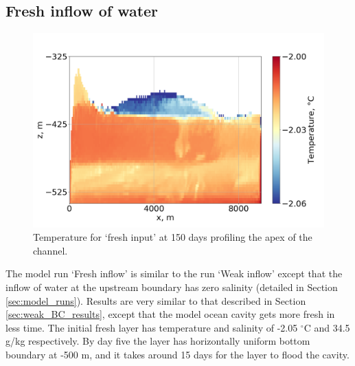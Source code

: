 \subsection{Fresh inflow of water} \label{sec:fresh_inflow}

\begin{figure}[!ht]
\centering
\includegraphics[width=1\textwidth]{chapters/4/fresh_input_T.png}
\caption[Fresh input (T)]{Temperature for `fresh input' at 150 days profiling the apex of the channel.}
\label{fig:fresh_input_T}
\end{figure}

The model run `Fresh inflow' is similar to the run `Weak inflow' except that the inflow of water at the upstream boundary has zero salinity (detailed in Section \ref{sec:model_runs}). Results are very similar to that described in Section \ref{sec:weak_BC_results}, except that the model ocean cavity gets more fresh in less time.
The initial fresh layer has temperature and salinity of -2.05 $^{\circ}$C and 34.5  g/kg respectively.  By day five the layer has horizontally uniform bottom boundary at -500 m, and it takes around 15 days for the layer to flood the cavity.

